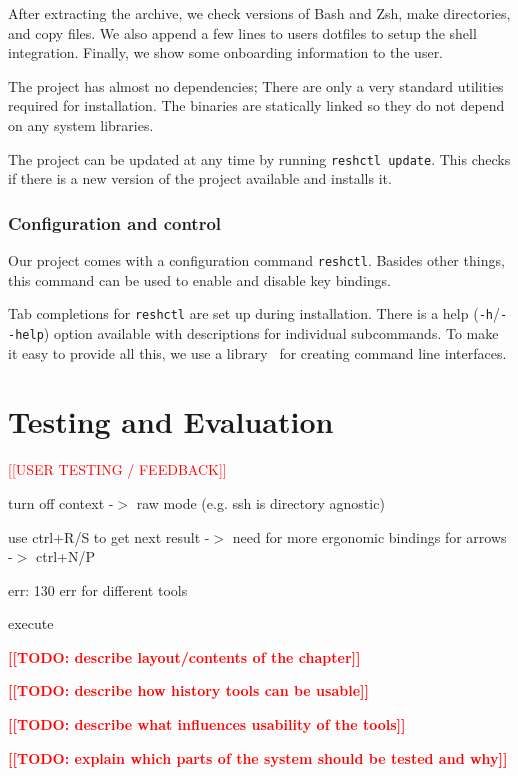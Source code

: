 \documentclass[thesis=M,english]{FITthesis}[2012/10/20]
\newcommand{\blind}[1][1]{}
\newcommand{\todotext}[1]{\textcolor{red}{\textbf{[[#1]]}}}
\newcommand{\redtext}[1]{\textcolor{red}{[[#1]]}}
\let\myCite\cite
\renewcommand\cite{\unskip~\myCite}
\begin{document}
After extracting the archive, we check versions of Bash and Zsh, make directories, and copy files. We also append a few lines to users dotfiles to setup the shell integration. Finally, we show some onboarding information to the user.

The project has almost no dependencies; There are only a very standard utilities required for installation. The binaries are statically linked so they do not depend on any system libraries.

The project can be updated at any time by running \verb|reshctl update|. This checks if there is a new version of the project available and installs it.

\subsection{Configuration and control}

Our project comes with a configuration command \verb|reshctl|. Basides other things, this command can be used to enable and disable key bindings. 

Tab completions for \verb|reshctl| are set up during installation. There is a help (\verb|-h|/\verb|--help|) option available with descriptions for individual subcommands. To make it easy to provide all this, we use a library\cite{lib-go-cobra} for creating command line interfaces.


\chapter{Testing and Evaluation}

\redtext{USER TESTING / FEEDBACK}

turn off context -$>$ raw mode (e.g. ssh is directory agnostic)

use ctrl+R/S to get next result -$>$ need for more ergonomic bindings for arrows -$>$ ctrl+N/P


err: 130
err for different tools

execute 


\todotext{TODO: describe layout/contents of the chapter}

\todotext{TODO: describe how history tools can be usable}

\todotext{TODO: describe what influences usability of the tools}

\todotext{TODO: explain which parts of the system should be tested and why}

\blind[3]
\end{document}
